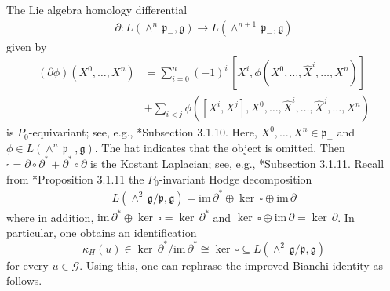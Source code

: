 \documentclass[11pt]{amsart}
\newtheorem{lemma}[proposition]{Lemma}
\begin{document}
The Lie algebra homology differential
\begin{align}\label{partial}
    \partial:L(\wedge^n\,\mathfrak p_-,\mathfrak g)\to L(\wedge^{n+1}\,\mathfrak p_-,\mathfrak g)
\end{align}
given by
\begin{align*}(\partial\phi)(X^0,\dots,X^n)&=\sum_{i=0}^n(-1)^i\,[X^i,\phi(X^0,\dots,\hat X^i,\dots,X^n)]\\
&+\sum_{i<j}\phi([X^i,X^j],X^0,\dots,\hat X^i,\dots,\hat X^j,\dots,X^n)
\end{align*}
is $P_0$-equivariant; see, e.g., \cite{Book}*{Subsection 3.1.10}. Here, $X^0,\dots,X^n\in\mathfrak p_-$ and $\phi\in L(\wedge^n\,\mathfrak p_-,\mathfrak g)$. The hat indicates that the object is omitted. Then $\square=\partial\circ\partial^*+\partial^*\circ\partial$ is the Kostant Laplacian; see, e.g., \cite{Book}*{Subsection 3.1.11}. Recall from \cite{Book}*{Proposition 3.1.11} the $P_0$-invariant Hodge decomposition
\begin{align}\label{Hodge}
   L(\wedge^2\,\mathfrak g/\mathfrak p,\mathfrak g)=\mathrm{im}\,\partial^*\oplus\ker\,\square\oplus\mathrm{im}\,\partial 
\end{align}
where in addition, $\mathrm{im}\,\partial^*\oplus\ker\,\square=\ker\,\partial^*$ and $\ker\,\square\oplus\mathrm{im}\,\partial=\ker\,\partial$. In particular, one obtains an identification
\[\kappa_H(u)\in\ker\,\partial^*/\mathrm{im}\,\partial^*
\cong\ker\,\square\subseteq L(\wedge^2\,\mathfrak g/\mathfrak p,\mathfrak g)\]
for every $u\in\mathcal G$. Using this, one can rephrase the improved Bianchi identity as follows.
\end{document}
